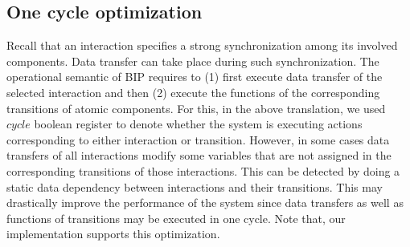 \subsection{One cycle optimization}
Recall that an interaction specifies a strong synchronization among its involved components. Data transfer can take place during such synchronization. The operational semantic of BIP requires to (1) first execute data transfer of the selected interaction and then (2) execute the functions of the corresponding transitions of atomic components. For this, in the above translation, we used $cycle$ boolean register to denote whether the system is executing actions corresponding to either interaction or transition. However, in some cases data transfers of all interactions modify some variables that are not assigned in the corresponding transitions of those interactions. This can be detected by doing a static data dependency between interactions and their transitions. 
This may drastically improve the performance of the system since data transfers as well as functions of transitions may be executed in one cycle. Note that, our implementation supports this optimization.   

